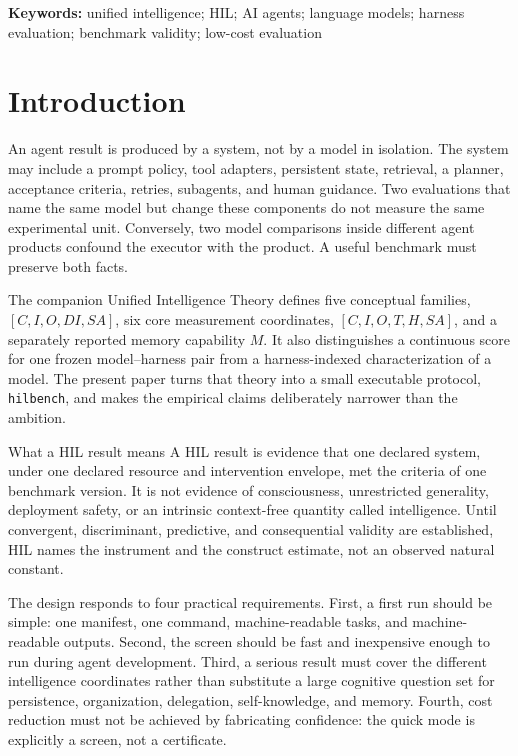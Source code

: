 \documentclass[11pt]{article}
\theoremstyle{definition}
\begin{document}
\noindent\textbf{Keywords:} unified intelligence; HIL; AI agents; language models; harness evaluation; benchmark validity; low-cost evaluation

\tableofcontents
\bigskip

\section{Introduction}\label{sec:intro}

An agent result is produced by a system, not by a model in isolation. The system may include a prompt policy, tool adapters, persistent state, retrieval, a planner, acceptance criteria, retries, subagents, and human guidance. Two evaluations that name the same model but change these components do not measure the same experimental unit. Conversely, two model comparisons inside different agent products confound the executor with the product. A useful benchmark must preserve both facts.

The companion Unified Intelligence Theory defines five conceptual families, $[C,I,O,DI,SA]$, six core measurement coordinates, $[C,I,O,T,H,SA]$, and a separately reported memory capability $M$. It also distinguishes a continuous score for one frozen model--harness pair from a harness-indexed characterization of a model. The present paper turns that theory into a small executable protocol, \texttt{hilbench}, and makes the empirical claims deliberately narrower than the ambition.

\begin{cautionbox}{What a HIL result means}
A HIL result is evidence that one declared system, under one declared resource and intervention envelope, met the criteria of one benchmark version. It is not evidence of consciousness, unrestricted generality, deployment safety, or an intrinsic context-free quantity called intelligence. Until convergent, discriminant, predictive, and consequential validity are established, HIL names the instrument and the construct estimate, not an observed natural constant.
\end{cautionbox}

The design responds to four practical requirements. First, a first run should be simple: one manifest, one command, machine-readable tasks, and machine-readable outputs. Second, the screen should be fast and inexpensive enough to run during agent development. Third, a serious result must cover the different intelligence coordinates rather than substitute a large cognitive question set for persistence, organization, delegation, self-knowledge, and memory. Fourth, cost reduction must not be achieved by fabricating confidence: the quick mode is explicitly a screen, not a certificate.
\end{document}
